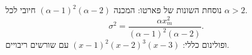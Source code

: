 

נוסחת השונות של פארטו: המכנה \(( \alpha-1)^2(\alpha-2)\) חיובי לכל \(\alpha>2\).
\[ \sigma^2 = \frac{\alpha x_m^2}{(\alpha-1)^2(\alpha-2)}. \]
ופולינום כללי: \((x-1)^2(x-2)^3(x-3)\) עם שורשים ריבויים.

